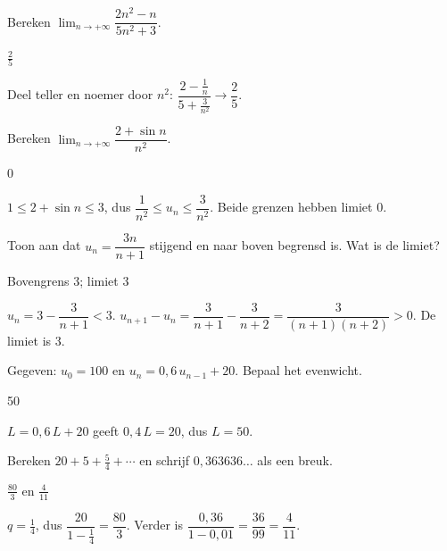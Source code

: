\begin{oefeningen}
\begin{oefening}[1]\label{oef:h4-t4}
Bereken $\displaystyle\lim_{n\to+\infty} \dfrac{2n^2 - n}{5n^2 + 3}$.
\begin{solution}
$\tfrac25$
\end{solution}
\begin{fullsolution}
Deel teller en noemer door $n^2$: $\dfrac{2-\tfrac1n}{5+\tfrac{3}{n^2}}\to\dfrac25$.
\end{fullsolution}
\end{oefening}

\begin{oefening}[2]\label{oef:h4-t5}
Bereken $\displaystyle\lim_{n\to+\infty} \dfrac{2 + \sin n}{n^2}$.
\begin{solution}
0
\end{solution}
\begin{fullsolution}
$1\leqslant 2+\sin n\leqslant 3$, dus $\dfrac{1}{n^2}\leqslant u_n\leqslant\dfrac{3}{n^2}$. Beide grenzen hebben limiet 0.
\end{fullsolution}
\end{oefening}

\begin{oefening}[2]\label{oef:h4-t6}
Toon aan dat $u_n = \dfrac{3n}{n+1}$ stijgend en naar boven begrensd is. Wat is de limiet?
\begin{solution}
Bovengrens 3; limiet 3
\end{solution}
\begin{fullsolution}
$u_n=3-\dfrac{3}{n+1}<3$. $u_{n+1}-u_n=\dfrac{3}{n+1}-\dfrac{3}{n+2}=\dfrac{3}{(n+1)(n+2)}>0$. De limiet is 3.
\end{fullsolution}
\end{oefening}

\begin{oefening}[1]\label{oef:h4-t7}
Gegeven: $u_0 = 100$ en $u_n = 0{,}6\,u_{n-1} + 20$. Bepaal het evenwicht.
\begin{solution}
50
\end{solution}
\begin{fullsolution}
$L=0{,}6\,L+20$ geeft $0{,}4\,L=20$, dus $L=50$.
\end{fullsolution}
\end{oefening}

\begin{oefening}[1]\label{oef:h4-t8}
Bereken $20 + 5 + \tfrac54 + \cdots$ en schrijf $0{,}363636\ldots$ als een breuk.
\begin{solution}
$\tfrac{80}{3}$ en $\tfrac{4}{11}$
\end{solution}
\begin{fullsolution}
$q=\tfrac14$, dus $\dfrac{20}{1-\tfrac14}=\dfrac{80}{3}$. Verder is $\dfrac{0{,}36}{1-0{,}01}=\dfrac{36}{99}=\dfrac{4}{11}$.
\end{fullsolution}
\end{oefening}
\end{oefeningen}

